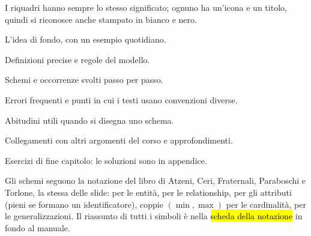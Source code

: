 I riquadri hanno sempre lo stesso significato; ognuno ha un'icona e un titolo, quindi si riconosce anche stampato in bianco e nero.
\begin{intuizione}L'idea di fondo, con un esempio quotidiano.\end{intuizione}
\begin{tecnica}Definizioni precise e regole del modello.\end{tecnica}
\begin{esempio}Schemi e occorrenze svolti passo per passo.\end{esempio}
\begin{attenzione}Errori frequenti e punti in cui i testi usano convenzioni diverse.\end{attenzione}
\begin{consiglio}Abitudini utili quando si disegna uno schema.\end{consiglio}
\begin{mlbox}Collegamenti con altri argomenti del corso e approfondimenti.\end{mlbox}
\begin{esercizi}Esercizi di fine capitolo: le soluzioni sono in appendice.\end{esercizi}


\clearpage\thispagestyle{plain}
\tableofcontents
\vspace{12pt}
\begin{mlbox}
Gli schemi seguono la notazione del libro di Atzeni, Ceri, Fraternali, Paraboschi e Torlone, la stessa delle slide:  per le entità,  per le relationship,  per gli attributi (pieni se formano un identificatore), coppie $(\min,\max)$ per le cardinalità,  per le generalizzazioni. Il riassunto di tutti i simboli è nella \hl{scheda della notazione} in fondo al manuale.
\end{mlbox}
















